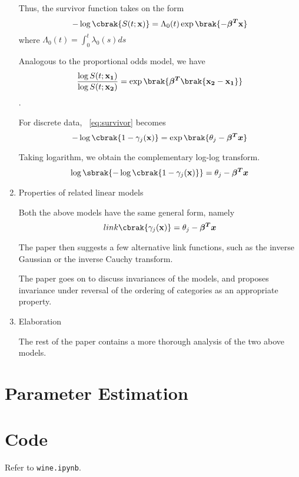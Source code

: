 \documentclass{amsart}
\begin{document}
\begin{enumerate}[label=\textbf{(\Roman*)}]
        Thus, the survivor function takes on the form 
        \[-\log \cbrak{S(t; \mathbf{x})} = \Lambda_0(t) \exp \brak{-\boldsymbol{\beta^T} \mathbf{x}} \label{eq:survivor}\] 
        where \(\Lambda_0(t) = \int_{0}^{t} \lambda_0(s) ds \)

        Analogous to the proportional odds model, we have 
        \[ \frac{\log S(t; \mathbf{x_1})}{\log S(t; \mathbf{x_2})} = \exp \brak{\boldsymbol{\beta^T} \brak{\mathbf{x_2 - x_1}}}\].


        For discrete data, ~\ref{eq:survivor} becomes 
        \[-\log \cbrak{1 - \gamma_j (\mathbf{x})} = \exp \brak{\theta_j - \boldsymbol{\beta^T x}}\]

        Taking logarithm, we obtain the complementary log-log transform.
        \[\log \sbrak{ - \log \cbrak{1 - \gamma_j (\mathbf{x})}} = \theta_j - \boldsymbol{\beta^T x} \]


    \item Properties of related linear models
    
        Both the above models have the same general form, namely \[link\cbrak{\gamma_j(\mathbf{x})} = \theta_j - \boldsymbol{\beta^T x} \]

        The paper then suggests a few alternative link functions, such as the inverse Gaussian or the inverse Cauchy transform.

        The paper goes on to discuss invariances of the models, and proposes invariance under reversal of the ordering of categories as an appropriate property. 

    \item Elaboration
    
    The rest of the paper contains a more thorough analysis of the two above models.

    \end{enumerate}

    \section{Parameter Estimation}

    

    \section{Code}

    Refer to \texttt{wine.ipynb}.
\end{document}
